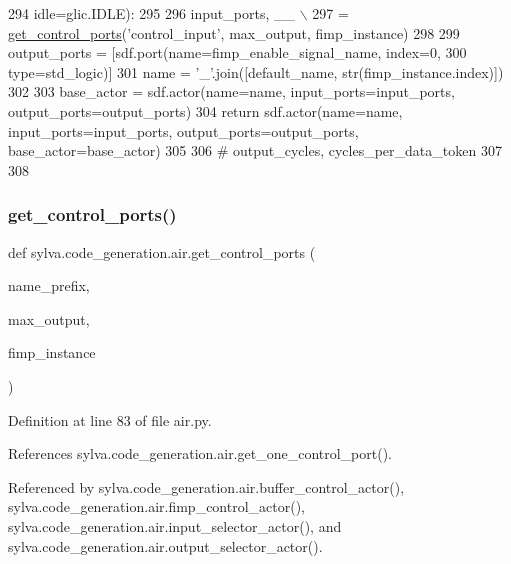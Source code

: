 \begin{DoxyCode}
294                        idle=glic.IDLE):
295 
296     input\_ports, \_\_ \(\backslash\)
297         = \hyperlink{namespacesylva_1_1code__generation_1_1air_a71d379169f113b29c326aa9f70c6d47e}{get\_control\_ports}(\textcolor{stringliteral}{'control\_input'}, max\_output, fimp\_instance)
298 
299     output\_ports = [sdf.port(name=fimp\_enable\_signal\_name, index=0,
300                              type=std\_logic)]
301     name = \textcolor{stringliteral}{'\_'}.join([default\_name, str(fimp\_instance.index)])
302 
303     base\_actor = sdf.actor(name=name, input\_ports=input\_ports, output\_ports=output\_ports)
304     \textcolor{keywordflow}{return} sdf.actor(name=name, input\_ports=input\_ports, output\_ports=output\_ports, base\_actor=base\_actor)
305 
306 \textcolor{comment}{# output\_cycles, cycles\_per\_data\_token}
307 
308 
\end{DoxyCode}
\mbox{\label{namespacesylva_1_1code__generation_1_1air_a71d379169f113b29c326aa9f70c6d47e}} 
\subsubsection{\texorpdfstring{get\+\_\+control\+\_\+ports()}{get\_control\_ports()}}
{\footnotesize\ttfamily def sylva.\+code\+\_\+generation.\+air.\+get\+\_\+control\+\_\+ports (\begin{DoxyParamCaption}\item[{}]{name\+\_\+prefix,  }\item[{}]{max\+\_\+output,  }\item[{}]{fimp\+\_\+instance }\end{DoxyParamCaption})}



Definition at line 83 of file air.\+py.



References sylva.\+code\+\_\+generation.\+air.\+get\+\_\+one\+\_\+control\+\_\+port().



Referenced by sylva.\+code\+\_\+generation.\+air.\+buffer\+\_\+control\+\_\+actor(), sylva.\+code\+\_\+generation.\+air.\+fimp\+\_\+control\+\_\+actor(), sylva.\+code\+\_\+generation.\+air.\+input\+\_\+selector\+\_\+actor(), and sylva.\+code\+\_\+generation.\+air.\+output\+\_\+selector\+\_\+actor().


